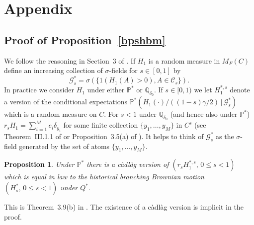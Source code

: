 \documentclass[12pt]{article}
\newtheorem{proposition}[theorem]{Proposition}
\numberwithin{theorem}{section}
\theoremstyle{def}
\numberwithin{equation}{section}
\renewcommand{\P}{\mathbb{P}}
\newcommand{\Q}{\mathbb{Q}}
\newcommand{\cC}{\mathcal C}
\newcommand{\cG}{\mathcal G}
\begin{document}
{\section{Appendix}
\subsection{Proof of Proposition~\ref{bpshbm}}\label{app:subsec:bpshbm}
We follow the reasoning in Section~3 of \cite{DP91}. 
If $H_1$ is a random measure in $M_F(C)$ define an increasing collection of $\sigma$-fields for $s\in [0,1]$ by
\[\cG^*_s=\sigma(\{1(H_1(A)>0),A\in\cC_s\}).\]
In practice we consider $H_1$ under either $\P^*$ or $\Q_{\delta_0}$. 
If $s\in[0,1)$ we let $H_1^{*,s}$ denote a version of the conditional expectations $\P^*(H_1(\cdot)/((1-s)\gamma/2)\, | \, \cG^{*}_s)$ which is a random measure on $C$.  
For $s<1$ under $\Q_{\delta_0}$ (and hence also under $\P^*$) $r_sH_1=\sum_{i=1}^M e_i\delta_{y_i}$ for some finite collection $\{y_1,\dots,y_M\}$ in $C^s$ (see Theorem~III.1.1 of \cite{Per02} or Proposition~3.5(a) of \cite{DP91}).   
It helps to think of $\cG^{*}_s$ as the $\sigma$-field generated by the set of atoms $\{y_1,\dots,y_M\}$. 

\begin{proposition}\label{thm3.9} Under $\P^*$ there is a c\`adl\`ag version of $(r_sH_1^{*,s},\,0\le s<1)$ which is equal in law to the historical branching Brownian motion $(H^*_s,\, 0\le s<1)$ under $Q^*$. 
\end{proposition}

This is Theorem~3.9(b) in \cite{DP91}. The existence of a c\`adl\`ag version is implicit in the proof. 

}
\end{document}
